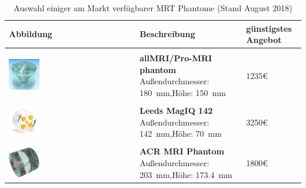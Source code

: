 \begin{table}[H]
	\caption{Auswahl einiger am Markt verfügbarer MRT Phantome (Stand August 2018)}
	\centering
	\begin{tabularx}{\textwidth}{l X l}
		\toprule
		\textbf{Abbildung} & \textbf{Beschreibung} & \textbf{günstigstes Angebot} \\
		\midrule \\[5pt]
		\includegraphics[width=0.25\textwidth,valign=t]{img/phantoms/allMRI.jpg} & \textbf{allMRI/\-Pro-MRI \newline180mm phantom} \newline Außendurchmesser: \SI{180}{\mm},\newline Höhe: \SI{150}{\mm} \newline \cite{allMRIphantom} & 1235€ \\
		&&\\
		\includegraphics[width=0.25\textwidth,valign=t]{img/phantoms/MagIQ.jpg} & \textbf{Leeds MagIQ 142} \newline Außendurchmesser: \SI{142}{\mm},\newline Höhe: \SI{70}{\mm} \newline \cite{leeds} & 3250€ \\
		&&\\
		\includegraphics[width=0.25\textwidth,valign=t]{img/phantoms/acr.jpg} & \textbf{ACR MRI Phantom} \newline Außendurchmesser: \SI{203}{\mm},\newline Höhe: \SI{173.4}{\mm} \newline \cite{acr}  & 1800€ \\

\end{tabularx}
\end{table}
